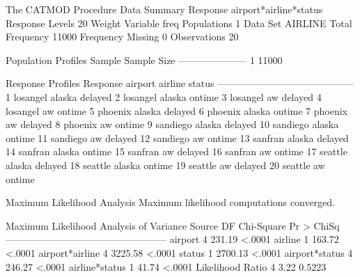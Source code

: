 \documentclass{article}
\begin{document}
\begin{Woutput}
The CATMOD Procedure
                            Data Summary
Response           airport*airline*status     Response Levels     20
Weight Variable    freq                       Populations          1
Data Set           AIRLINE                    Total Frequency  11000
Frequency Missing  0                          Observations        20

 Population Profiles
Sample    Sample Size
---------------------
    1           11000

            Response Profiles
Response    airport     airline    status
------------------------------------------
    1       losangel    alaska     delayed
    2       losangel    alaska     ontime
    3       losangel    aw         delayed
    4       losangel    aw         ontime
    5       phoenix     alaska     delayed
    6       phoenix     alaska     ontime
    7       phoenix     aw         delayed
    8       phoenix     aw         ontime
    9       sandiego    alaska     delayed
   10       sandiego    alaska     ontime
   11       sandiego    aw         delayed
   12       sandiego    aw         ontime
   13       sanfran     alaska     delayed
   14       sanfran     alaska     ontime
   15       sanfran     aw         delayed
   16       sanfran     aw         ontime
   17       seattle     alaska     delayed
   18       seattle     alaska     ontime
   19       seattle     aw         delayed
   20       seattle     aw         ontime

                   Maximum Likelihood Analysis
           Maximum likelihood computations converged.

     Maximum Likelihood Analysis of Variance
Source               DF   Chi-Square    Pr > ChiSq
--------------------------------------------------
airport               4       231.19        <.0001
airline               1       163.72        <.0001
airport*airline       4      3225.58        <.0001
status                1      2700.13        <.0001
airport*status        4       246.27        <.0001
airline*status        1        41.74        <.0001
Likelihood Ratio      4         3.22        0.5223


\end{Woutput}
\end{document}
